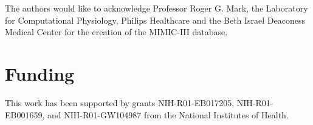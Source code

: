 \documentclass{bioinfo}
\begin{document}
The authors would like to acknowledge Professor Roger G. Mark, the Laboratory for Computational Physiology, Philips Healthcare and the Beth Israel Deaconess Medical Center for the creation of the MIMIC-III database.%

\section*{Funding}

This work has been supported by grants NIH-R01-EB017205, NIH-R01-EB001659, and NIH-R01-GW104987 from the National Institutes of Health.%

%
%
%
%
%
%
%
%
%
\end{document}
